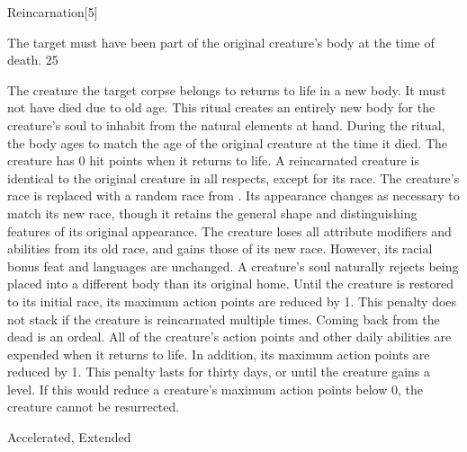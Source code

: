 \begin{spellsection}{Reincarnation}[5]
\begin{spellcontent}
\begin{spelltargetinginfo}
\spellspecial The target must have been part of the original creature's body at the time of death.
 25
\end{spelltargetinginfo}
\begin{spelleffects}
\spelleffect
The creature the target corpse belongs to returns to life in a new body.
It must not have died due to old age.
This ritual creates an entirely new body for the creature's soul to inhabit from the natural elements at hand.
During the ritual, the body ages to match the age of the original creature at the time it died.
The creature has 0 hit points when it returns to life.
A reincarnated creature is identical to the original creature in all respects, except for its race.
The creature's race is replaced with a random race from .
Its appearance changes as necessary to match its new race, though it retains the general shape and distinguishing features of its original appearance.
The creature loses all attribute modifiers and abilities from its old race, and gains those of its new race.
However, its racial bonus feat and languages are unchanged.
A creature's soul naturally rejects being placed into a different body than its original home.
Until the creature is restored to its initial race, its maximum action points are reduced by 1.
This penalty does not stack if the creature is reincarnated multiple times.
Coming back from the dead is an ordeal.
All of the creature's action points and other daily abilities are expended when it returns to life.
In addition, its maximum action points are reduced by 1.
This penalty lasts for thirty days, or until the creature gains a level.
If this would reduce a creature's maximum action points below 0, the creature cannot be resurrected.
\end{spelleffects}
\end{spellcontent}
\begin{spellfooter}
 Accelerated, Extended
\end{spellfooter}
\begin{spellsubcontent}
\end{spellsubcontent}
\end{spellsection}
